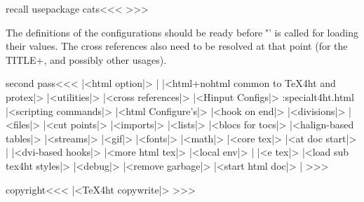 \<recall usepackage cats\><<<
\TivhTcats
>>>



The definitions of the configurations should be ready before
\''\Hinput' is called for loading their values.  The cross references
also need to be resolved at that point (for the TITLE+, and possibly
other usages).

\<second pass\><<<
|<html option|>                  |%
|<html+nohtml common to TeX4ht and protex|>
|<utilities|>
|<cross references|>
\ifHtml
   |<Hinput Configs|>
     \ht:special{t4ht.\:html} 
   |<scripting commands|>
   |<html Configure's|>   
   |<hook on end|>
\fi
|<divisions|>
|<files|>
|<cut points|>
|<imports|>
|<lists|>
|<blocs for tocs|>
\ifHtml
   |<halign-based tables|>
\fi
|<streams|>
|<gif|> 
|<fonts|>
|<math|>
|<core tex|>
|<at doc start|>  |%
\ifHtml
   |<dvi-based hooks|>
   |<more html tex|> 
\fi
|<local env|>                    |%
\ifx\beginL\@undefined \else
   \ifHtml 
      |<e tex|>
\fi\fi
|<load sub tex4ht styles|>
|<debug|>
|<remove garbage|>
\ifHtml |<start html doc|> \fi   |%
>>>






\<copyright\><<<
|<TeX4ht copywrite|>
>>>





